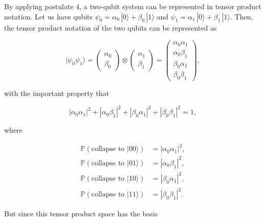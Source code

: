 \documentclass{article}
\begin{document}
    \begin{example}
      By applying postulate 4, a two-qubit system can be represented in tensor product notation. Let us have qubits $\psi_0 = \alpha_0 \, |0\rangle + \beta_0 \, |1\rangle$ and $\psi_1 = \alpha_1 \, |0\rangle + \beta_1 \, |1\rangle$. Then, the tensor product notation of the two qubits can be represented as

        \[|\psi_0 \psi_1 \rangle = \begin{pmatrix} \alpha_0 \\ \beta_0 \end{pmatrix} \otimes \begin{pmatrix} \alpha_1 \\ \beta_1 \end{pmatrix} = \begin{pmatrix} \alpha_0 \alpha_1 \\ \alpha_0 \beta_1 \\ \beta_0 \alpha_1 \\ \beta_0 \beta_1 \end{pmatrix},\]

      with the important property that

        \[|\alpha_0 \alpha_1|^2 + |\alpha_0 \beta_1|^2 + |\beta_0 \alpha_1|^2 + |\beta_0 \beta_1|^2 = 1,\]

      where

      \begin{align*}
        \mathbb{P}(\text{collapse to } |00\rangle) & = |\alpha_0 \alpha_1|^2, \\
        \mathbb{P}(\text{collapse to } |01\rangle) & = |\alpha_0 \beta_1|^2, \\
        \mathbb{P}(\text{collapse to } |10\rangle) & = |\beta_0 \alpha_1|^2, \\
        \mathbb{P}(\text{collapse to } |11\rangle) & = |\beta_0 \beta_1|^2.
      \end{align*}

      But since this tensor product space has the basis


\end{example}
\end{document}
